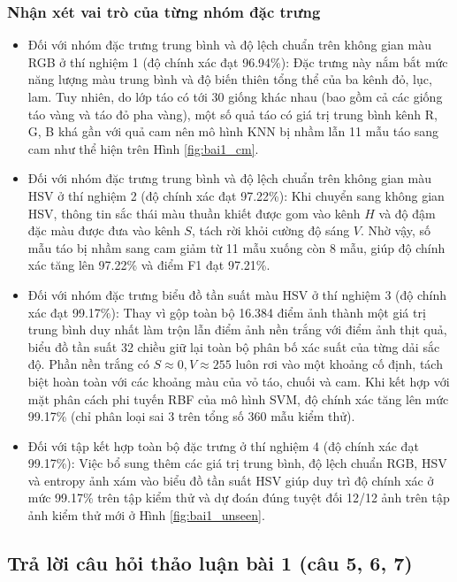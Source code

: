 \documentclass[12pt,a4paper]{article}
\begin{document}
\subsubsection*{Nhận xét vai trò của từng nhóm đặc trưng}
\begin{itemize}
    \item Đối với nhóm đặc trưng trung bình và độ lệch chuẩn trên không gian màu RGB ở thí nghiệm 1 (độ chính xác đạt 96.94\%): Đặc trưng này nắm bắt mức năng lượng màu trung bình và độ biến thiên tổng thể của ba kênh đỏ, lục, lam. Tuy nhiên, do lớp táo có tới 30 giống khác nhau (bao gồm cả các giống táo vàng và táo đỏ pha vàng), một số quả táo có giá trị trung bình kênh R, G, B khá gần với quả cam nên mô hình KNN bị nhầm lẫn 11 mẫu táo sang cam như thể hiện trên Hình \ref{fig:bai1_cm}.
    \item Đối với nhóm đặc trưng trung bình và độ lệch chuẩn trên không gian màu HSV ở thí nghiệm 2 (độ chính xác đạt 97.22\%): Khi chuyển sang không gian HSV, thông tin sắc thái màu thuần khiết được gom vào kênh $H$ và độ đậm đặc màu được đưa vào kênh $S$, tách rời khỏi cường độ sáng $V$. Nhờ vậy, số mẫu táo bị nhầm sang cam giảm từ 11 mẫu xuống còn 8 mẫu, giúp độ chính xác tăng lên 97.22\% và điểm F1 đạt 97.21\%.
    \item Đối với nhóm đặc trưng biểu đồ tần suất màu HSV ở thí nghiệm 3 (độ chính xác đạt 99.17\%): Thay vì gộp toàn bộ 16.384 điểm ảnh thành một giá trị trung bình duy nhất làm trộn lẫn điểm ảnh nền trắng với điểm ảnh thịt quả, biểu đồ tần suất 32 chiều giữ lại toàn bộ phân bố xác suất của từng dải sắc độ. Phần nền trắng có $S \approx 0, V \approx 255$ luôn rơi vào một khoảng cố định, tách biệt hoàn toàn với các khoảng màu của vỏ táo, chuối và cam. Khi kết hợp với mặt phân cách phi tuyến RBF của mô hình SVM, độ chính xác tăng lên mức 99.17\% (chỉ phân loại sai 3 trên tổng số 360 mẫu kiểm thử).
    \item Đối với tập kết hợp toàn bộ đặc trưng ở thí nghiệm 4 (độ chính xác đạt 99.17\%): Việc bổ sung thêm các giá trị trung bình, độ lệch chuẩn RGB, HSV và entropy ảnh xám vào biểu đồ tần suất HSV giúp duy trì độ chính xác ở mức 99.17\% trên tập kiểm thử và dự đoán đúng tuyệt đối 12/12 ảnh trên tập ảnh kiểm thử mới ở Hình \ref{fig:bai1_unseen}.
\end{itemize}

\subsection{Trả lời câu hỏi thảo luận bài 1 (câu 5, 6, 7)}
\end{document}
